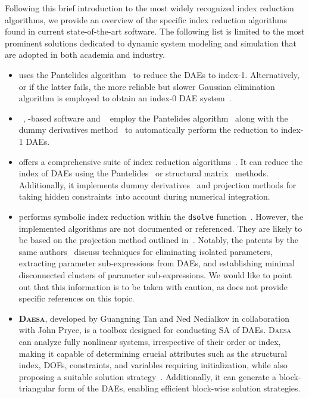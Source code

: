 Following this brief introduction to the most widely recognized index reduction algorithms, we provide an overview of the specific index reduction algorithms found in current state-of-the-art software. The following list is limited to the most prominent solutions dedicated to dynamic system modeling and simulation that are adopted in both academia and industry.
%
\begin{itemize}
  \setlength{\itemsep}{0.0em}
  \item \textbf{\Matlab{}} uses the Pantelides algorithm~\cite{pantelides1988consistent} to reduce the \acp{DAE} to index-1. Alternatively, or if the latter fails, the more reliable but slower Gaussian elimination algorithm is employed to obtain an index-0 \ac{DAE} system~\cite{matlab}.
  \item \textbf{\Modelica{}}~\cite{mattsson1997modelica, mattsson1998physical}, \Modelica{}-based software and \textbf{\ModelingToolkit{}}~\cite{modelingtoolkit} employ the Pantelides algorithm~\cite{pantelides1988consistent} along with the dummy derivatives method~\cite{mattsson1993index} to automatically perform the reduction to index-1 \acp{DAE}.
  \item \textbf{\Mathematica{}} offers a comprehensive suite of index reduction algorithms~\cite{mathematica}. It can reduce the index of \acp{DAE} using the Pantelides~\cite{pantelides1988consistent} or structural matrix~\cite{unger1995structural, chowdhry2004symbolic} methods. Additionally, it implements dummy derivatives~\cite{mattsson1993index} and projection methods for taking hidden constraints into account during numerical integration.
  \item \textbf{\Maple{}} performs symbolic index reduction within the \texttt{dsolve} function~\cite{maple}. However, the implemented algorithms are not documented or referenced. They are likely to be based on the projection method outlined in~\cite{shmoylova2013simplification}. Notably, the patents by the same authors~\cite{postma2012exact, shmoylova2012method, postma2015exact} discuss techniques for eliminating isolated parameters, extracting parameter sub-expressions from \acp{DAE}, and establishing minimal disconnected clusters of parameter sub-expressions. We would like to point out that this information is to be taken with caution, as \Maple{} does not provide specific references on this topic.
  \item \textbf{\textsc{Daesa}}, developed by Guangning Tan and Ned Nedialkov in collaboration with John Pryce, is a \Matlab{} toolbox designed for conducting \ac{SA} of \acp{DAE}. \textsc{Daesa} can analyze fully nonlinear systems, irrespective of their order or index, making it capable of determining crucial attributes such as the structural index, \acp{DOF}, constraints, and variables requiring initialization, while also proposing a suitable solution strategy~\cite{nedialkov2015algorithm, tan2016symbolic}. Additionally, it can generate a block-triangular form of the \acp{DAE}, enabling efficient block-wise solution strategies.

\end{itemize}
